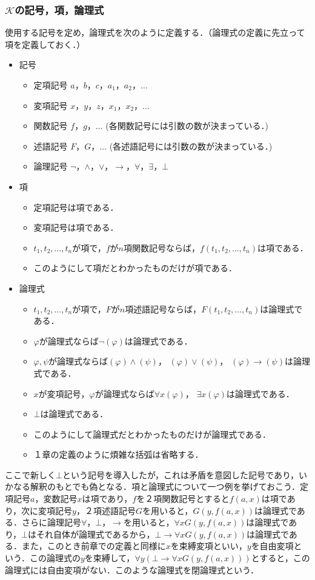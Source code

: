 \documentclass[10pt,b5paper,papersize,dvipdfmx]{jsbook}
\begin{document}
\subsubsection{$\mathcal K$の記号，項，論理式}
使用する記号を定め，論理式を次のように定義する．（論理式の定義に先立って項を定義しておく．）
\begin{itemize}
\item 記号
\begin{itemize}
\item 定項記号 $a$，$b$，$c$，$a_1$，$a_2$，$\dots$
\item 変項記号 $x$，$y$，$z$，$x_1$，$x_2$，$\dots$
\item 関数記号 $f$，$g$，$\dots$ (各関数記号には引数の数が決まっている．)
\item 述語記号 $F$，$G$，$\dots$ (各述語記号には引数の数が決まっている．)
\item 論理記号 $\lnot$，$\land$，$\lor$，$\to$，$\forall$，$\exists$，$\bot$
\end{itemize}
\item 項
\begin{itemize}
\item 定項記号は項である．
\item 変項記号は項である．
\item $t_1,t_2,\dots,t_n$が項で，$f$が$n$項関数記号ならば，$f(t_1,t_2,\dots,t_n)$は項である．
\item このようにして項だとわかったものだけが項である．
\end{itemize}
\item 論理式
\begin{itemize}
\item $t_1,t_2,\dots,t_n$が項で，$F$が$n$項述語記号ならば，$F(t_1,t_2,\dots,t_n)$は論理式である．
\item $\varphi$が論理式ならば$\lnot (\varphi)$は論理式である．
\item $\varphi,\psi$が論理式ならば$(\varphi) \land (\psi)$， $(\varphi) \lor (\psi)$， $(\varphi) \to (\psi)$は論理式である．
\item $x$が変項記号，$\varphi$が論理式ならば$\forall x (\varphi)$， $\exists x (\varphi)$は論理式である．
\item $\bot$は論理式である．
\item このようにして論理式だとわかったものだけが論理式である．
\item １章の定義のように煩雑な括弧は省略する．
\end{itemize}
\end{itemize}
ここで新しく$\bot$という記号を導入したが，これは矛盾を意図した記号であり，いかなる解釈のもとでも偽となる．項と論理式について一つ例を挙げておこう．定項記号$a$，変数記号$x$は項であり，$f$を２項関数記号とすると$f(a,x)$は項であり，次に変項記号$y$，２項述語記号$G$を用いると，$G(y,f(a,x))$は論理式である．さらに論理記号$\forall$，$\bot$，$\to$を用いると，$\forall xG(y,f(a,x))$は論理式であり，$\bot$はそれ自体が論理式であるから，$\bot \to \forall xG(y,f(a,x))$は論理式である．また，このとき前章での定義と同様に$x$を束縛変項といい，$y$を自由変項という．この論理式の$y$を束縛して，$\forall y(\bot \to \forall xG(y,f(a,x)))$とすると，この論理式には自由変項がない．このような論理式を閉論理式という．
\end{document}
